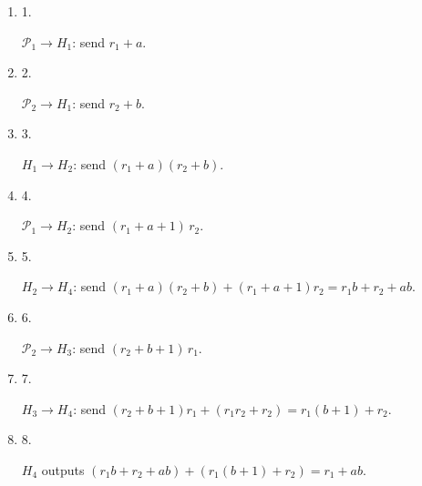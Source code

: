 \documentclass[10pt,a4paper]{article}
\begin{document}
\begin{enumerate}


\item[] 
1. 


$\mathcal{P}_{1}\rightarrow H_{1}$: send $r_{1}+a$.\par





\item[] 
2. 


$\mathcal{P}_{2}\rightarrow H_{1}$: send $r_{2}+b$.\par





\item[] 
3. 


$H_{1}\rightarrow H_{2}$: send $(r_{1}+a)(r_{2}+b)$.\par





\item[] 
4. 


$\mathcal{P}_{1}\rightarrow H_{2}$: send $(r_{1}+a+1)\,r_{2}$.\par





\item[] 
5. 


$H_{2}\rightarrow H_{4}$: send $(r_{1}+a)(r_{2}+b)+(r_{1}+a+1)r_{2}=r_{1}b+r_{2}+ab$.\par





\item[] 
6. 


$\mathcal{P}_{2}\rightarrow H_{3}$: send $(r_{2}+b+1)\,r_{1}$.\par





\item[] 
7. 


$H_{3}\rightarrow H_{4}$: send $(r_{2}+b+1)r_{1}+(r_{1}r_{2}+r_{2})=r_{1}(b+1)+r_{2}$.\par





\item[] 
8. 


$H_{4}$ outputs $(r_{1}b+r_{2}+ab)+(r_{1}(b+1)+r_{2})=r_{1}+ab$.\par





\end{enumerate}
\end{document}
